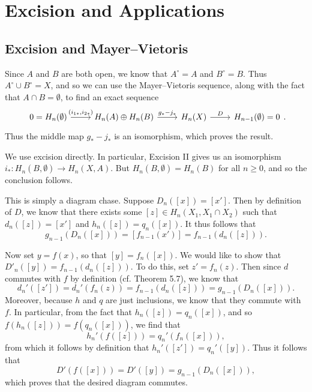 \documentclass[../../solutions.tex]{subfiles}
\begin{document}
\section{Excision and Applications}
\subsection{Excision and Mayer--Vietoris}
\begin{exercise} \leavevmode
Since $A$ and $B$ are both open, we know that $A^\circ=A$ and $B^\circ=B$.
Thus $A^\circ\cup B^\circ=X$, and so we can use the Mayer--Vietoris sequence, along with the fact that $A\cap B=\emptyset$, to find an exact sequence
\[\begin{tikzcd}
0=H_n(\emptyset)\ar[r,"{(i_{1*},i_{2*})}"] & H_n(A)\oplus H_n(B)\ar[r,"g_*-j_*"] & H_n(X)\ar[r,"D"] & H_{n-1}(\emptyset) = 0
\end{tikzcd}.\]
Thus the middle map $g_*-j_*$ is an isomorphism, which proves the result.
\end{exercise}

\begin{exercise} \leavevmode
We use excision directly.
In particular, Excision II gives us an isomorphism $i_*:H_n(B,\emptyset)\to H_n(X,A)$.
But $H_n(B,\emptyset)=H_n(B)$ for all $n\ge0$, and so the conclusion follows.
\end{exercise}

\begin{exercise} \leavevmode
This is simply a diagram chase.
Suppose $D_n([x])=[x']$.
Then by definition of $D$, we know that there exists some $[z]\in H_n(X_1,X_1\cap X_2)$ such that $d_n([z])=[x']$ and $h_n([z])=q_n([x])$.
It thus follows that
\[g_{n-1}(D_n([x]))=[f_{n-1}(x')]=f_{n-1}(d_n([z])).\]

Now set $y=f(x)$, so that $[y]=f_n([x])$.
We would like to show that $D'_n([y])=f_{n-1}(d_n([z]))$.
To do this, set $z'=f_n(z)$.
Then since $d$ commutes with $f$ by definition (cf. Theorem 5.7), we know that
\[d_n'([z'])=d_n'(f_n(z))=f_{n-1}(d_n([z]))=g_{n-1}(D_n([x])).\]
Moreover, because $h$ and $q$ are just inclusions, we know that they commute with $f$.
In particular, from the fact that $h_n([z])=q_n([x])$, and so $f(h_n([z]))=f(q_n([x]))$, we find that
\[h_n'(f([z]))=q_n'(f_n([x])),\]
from which it follows by definition that $h_n'([z'])=q_n'([y])$.
Thus it follows that
\[D'(f([x]))=D'([y])=g_{n-1}(D_n([x])),\]
which proves that the desired diagram commutes.
\end{exercise}
\end{document}
